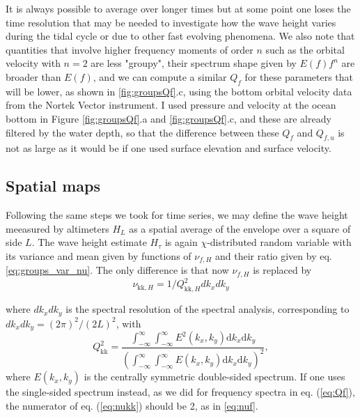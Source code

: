 {It is always possible to average over longer times but at some point one loses the time resolution that may be needed to investigate how the wave height varies during the tidal cycle or due to other fast evolving phenomena. We also note that quantities that involve higher frequency moments of order $n$ such as the orbital velocity with $n=2$ are less "groupy", their spectrum shape given by $E(f)f^n$ are broader than $E(f)$,  and we can compute a similar $Q_f$ for these parameters that will be lower, as shown in  \ref{fig:groupsQf}.c, using the bottom orbital velocity data from the Nortek Vector instrument. I used pressure and velocity at the ocean bottom in Figure \ref{fig:groupsQf}.a and \ref{fig:groupsQf}.c, and these are already filtered by the water depth, so that the difference between these  $Q_f$  and  $Q_{f,u}$ is not as large as it would be if one used surface elevation and surface velocity.  


\subsection{Spatial maps}
Following the same steps we took for time series, we may define the wave height meeasured by altimeters $H_{L}$ as a spatial average of the envelope over a 
square of side $L$. The wave height estimate $H_\tau$ is  again $\chi$-distributed random variable with its variance and mean given by  functions of $\nu_{f,H}$ and their ratio given by eq. \ref{eq:groups_var_nu}. The only difference is that now  $\nu_{f,H}$ is replaced by 
\begin{equation} 
\nu_{\mathrm{kk},H}=1/ Q_{\mathrm{kk},H}^2 dk_x dk_y \label{eq:nukk}
\end{equation}

 where $dk_x dk_y$ is the spectral resolution of the spectral analysis, corresponding to $dk_x dk_y=(2 \pi)^2/(2 L)^2$, with 
\begin{equation} 
   Q_{\mathrm{kk}}^2 = \frac{  \int_{-\infty}^\infty \int_{-\infty}^\infty E^2(k_x,k_y)\mathrm{d}k_x \mathrm{d}k_y }{\left( \int_{-\infty}^\infty \int_{-\infty}^\infty E(k_x,k_y)\mathrm{d}k_x \mathrm{d}k_y  \right)^2} \label{eq:Qkk},
\end{equation}
where  $E(k_x,k_y)$ is the centrally symmetric double-sided spectrum. If one uses the single-sided spectrum instead, as we did for frequency spectra in eq. (\ref{eq:Qf}), the numerator of eq. (\ref{eq:nukk}) should be 2, as in \ref{eq:nuf}. 

}
